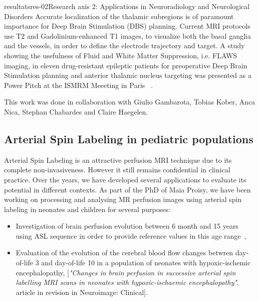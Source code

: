 \documentclass{ra2018}
\begin{document}
\begin{module}{resultats}{res-02}{Research axis 2: Applications in Neuroradiology and Neurological Disorders}
Accurate localization of the thalamic subregions is of paramount importance for Deep Brain Stimulation (DBS) planning. Current MRI protocols use T2 and Gadolinium-enhanced T1 images, to visualize both the basal ganglia and the vessels, in order to define the electrode trajectory and target. A study showing the usefulness of Fluid and White Matter Suppression, i.e. FLAWS imaging, in eleven drug-resistant epileptic patients for preoperative Deep Brain Stimulation planning and anterior thalamic nucleus targeting was presented as a Power Pitch at the ISMRM Meeeting in Paris ~\cite{bannier:inserm-01939451}.

This work was done in collaboration with Giulio Gambarota, Tobias Kober, Anca Nica, Stephan Chabardes and Claire Haegelen.

\subsection{Arterial Spin Labeling in pediatric populations}
\begin{participants}
\end{participants}
Arterial Spin Labeling is an attractive perfusion MRI technique due to its complete non-invasiveness. However
it still remains confidential in clinical practice. Over the years, we have developed several applications to
evaluate its potential in different contexts. As part of the PhD of Maia Proisy, we have been working on processing and analysing
MR perfusion images using arterial spin labeling in neonates and children for several purposes:
\begin{itemize}
    \item Investigation of brain perfusion evolution between 6 month and 15 years using ASL sequence in order to provide reference values in this age range~\cite{carsinvu:inserm-01708945},
    \item Evaluation of the evolution of the cerebral blood flow changes betwren day-of-life 3 and day-of-life 10 in a population of neonates with hypoxic-ischemic encephalopathy\cite{proisy:inserm-01944507}, [\textit{"Changes in brain perfusion in successive arterial spin labelling MRI scans in neonates with hypoxic-ischaemic encephalopathy"}, article in revision in Neuroimage: Clinical].
\end{itemize}


\end{module}
\end{document}
